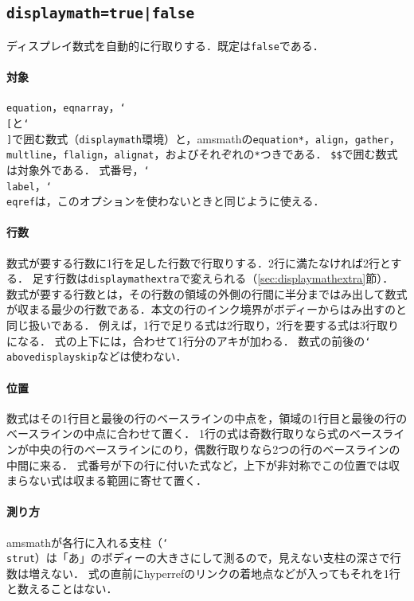 \documentclass[paper=a4,dvipdfmx]{jlreq}
\newcommand\pkg[1]{\textsf{#1}}
\newcommand\opt[1]{\texttt{#1}}
\newcommand\env[1]{\texttt{#1}}
\newcommand\cs[1]{\texttt{\char`\\#1}}
\begin{document}
\subsection{\opt{displaymath=true|false}}
\label{sec:displaymath}

ディスプレイ数式を自動的に行取りする．既定は\opt{false}である．

\paragraph{対象}

\env{equation}，\env{eqnarray}，\cs{[}と\cs{]}で囲む数式（\env{displaymath}環境）と，\pkg{amsmath}の\env{equation*}，\env{align}，\env{gather}，\env{multline}，\env{flalign}，\env{alignat}，およびそれぞれの\env{*}つきである．
\verb|$$|で囲む数式は対象外である．
式番号，\cs{label}，\cs{eqref}は，このオプションを使わないときと同じように使える．

\paragraph{行数}

数式が要する行数に1行を足した行数で行取りする．2行に満たなければ2行とする．
足す行数は\opt{displaymathextra}で変えられる（\ref{sec:displaymathextra}\nobreak 節）．
数式が要する行数とは，その行数の領域の外側の行間に半分まではみ出して数式が収まる最少の行数である．本文の行のインク境界がボディーからはみ出すのと同じ扱いである．
例えば，1行で足りる式は2行取り，2行を要する式は3行取りになる．
式の上下には，合わせて1行分のアキが加わる．
数式の前後の\cs{abovedisplayskip}などは使わない．

\paragraph{位置}

数式はその1行目と最後の行のベースラインの中点を，領域の1行目と最後の行のベースラインの中点に合わせて置く．
1行の式は奇数行取りなら式のベースラインが中央の行のベースラインにのり，偶数行取りなら2つの行のベースラインの中間に来る．
式番号が下の行に付いた式など，上下が非対称でこの位置では収まらない式は収まる範囲に寄せて置く．

\paragraph{測り方}

\pkg{amsmath}が各行に入れる支柱（\cs{strut}）は「あ」のボディーの大きさにして測るので，見えない支柱の深さで行数は増えない．
式の直前にhyperrefのリンクの着地点などが入ってもそれを1行と数えることはない．
\end{document}
